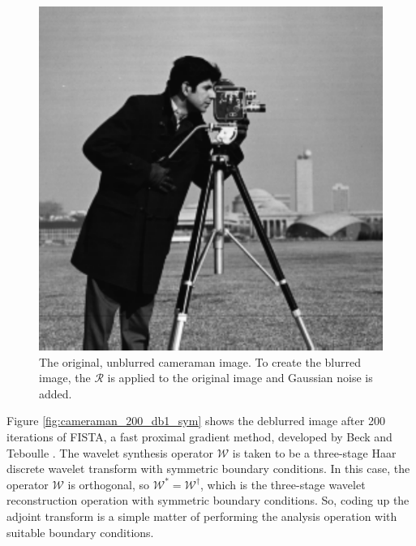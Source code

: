 \documentclass[journal]{IEEEtran}
\begin{document}
\begin{figure}
   \centering
   \includegraphics[width=0.8\columnwidth]{figures/cameraman.pdf}
   \caption{The original, unblurred cameraman image.  To create the blurred image, the $\mathcal{R}$ is applied to the original image and Gaussian noise is added.}
   \label{fig:cameraman_original}
\end{figure}

Figure \ref{fig:cameraman_200_db1_sym} shows the deblurred image after 200 iterations of FISTA, a fast proximal gradient method, developed by Beck and Teboulle \cite{beck_2009}.  The wavelet synthesis operator $\mathcal{W}$ is taken to be a three-stage Haar discrete wavelet transform with symmetric boundary conditions.  In this case, the operator $\mathcal{W}$ is orthogonal, so $\mathcal{W}^\ast = \mathcal{W}^\dagger$, which is the three-stage wavelet reconstruction operation with symmetric boundary conditions.  So, coding up the adjoint transform is a simple matter of performing the analysis operation with suitable boundary conditions.
\end{document}
